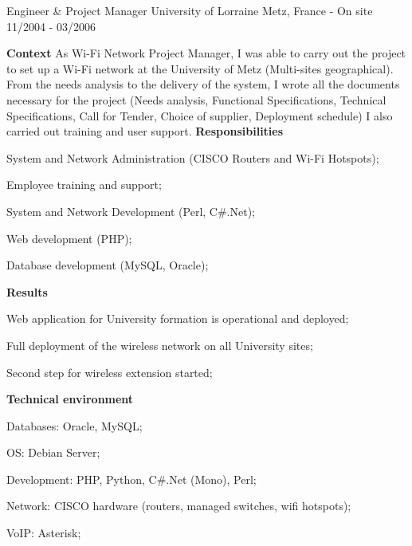 \begin{cventries}
  \cventry
    {Engineer \& Project Manager} %
    {University of Lorraine} %
    {Metz, France - On site} %
    {11/2004 - 03/2006} %
    {
      \textbf{Context}
      \newline
      As Wi-Fi Network Project Manager, I was able to carry out the project to set up a 
      Wi-Fi network at the University of Metz (Multi-sites geographical). 
      \newline
      From the needs analysis to the delivery of the system, I wrote all the documents 
      necessary for the project (Needs analysis, Functional Specifications, Technical 
      Specifications, Call for Tender, Choice of supplier, Deployment schedule) 
      \newline
      I also carried out training and user support.
      \newline \vspace{2pt}
      \textbf{Responsibilities}
      \newline \vspace{12pt}
      \begin{cvitems}
        \item {System and Network Administration (CISCO Routers and Wi-Fi Hotspots);}
        \item {Employee training and support;}
        \item {System and Network Development (Perl, C\#.Net);}
        \item {Web development (PHP);}
        \item {Database development (MySQL, Oracle);}
      \end{cvitems}
      \textbf{Results}
      \newline \vspace{12pt}
      \begin{cvitems}
        \item {Web application for University formation is operational and deployed;}
        \item {Full deployment of the wireless network on all University sites;}
        \item {Second step for wireless extension started;}
      \end{cvitems}
      \textbf{Technical environment}
      \newline \vspace{12pt}
      \begin{cvitems}
        \item {Databases: Oracle, MySQL;}
        \item {OS: Debian Server;}
        \item {Development: PHP, Python, C\#.Net (Mono), Perl;}
        \item {Network: CISCO hardware (routers, managed switches, wifi hotspots);}
        \item {VoIP: Asterisk;}
      \end{cvitems}
    }


  \end{cventries}
